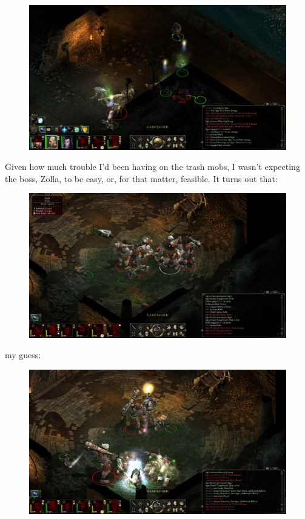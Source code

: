 \documentclass{article}
\begin{document}
\begin{figure}
\includegraphics[scale=0.33]{files/blog/2018_06_16_pillars_of_eternity_path_of_the_damned_act_i/2018_06_16_l3_ogres_are_hard.jpg}
\end{figure}

Given how much trouble I'd been having on the trash mobs, I wasn't expecting the boss, Zolla, to be easy, or, for that matter, feasible.  It turns out that:

\begin{figure}
\includegraphics[scale=0.33]{files/blog/2018_06_16_pillars_of_eternity_path_of_the_damned_act_i/2018_06_16_zolla_r1_wipe1.jpg}
\end{figure}

my guess:

\begin{figure}
\includegraphics[scale=0.33]{files/blog/2018_06_16_pillars_of_eternity_path_of_the_damned_act_i/2018_06_16_zolla_r1_wipe2.jpg}
\end{figure}
\end{document}
